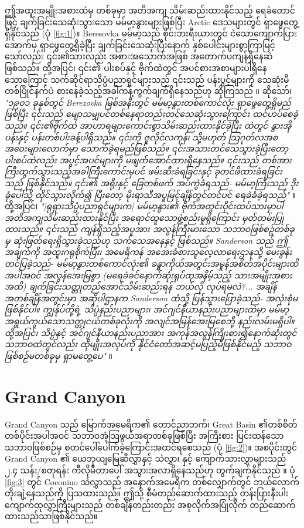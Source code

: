 \documentclass[10pt,twocolumn,letterpaper]{article}
\begin{document}
ဤအထူးအမျိုးအစားထဲမှ တစ်ခုမှာ အတိအကျ သိမ်းဆည်းထားနိုင်သည့် ရေခဲတောင်ဖြင့် ချက်ခြင်းသေဆုံးသွားသော မမ်မာ့နွားများဖြစ်ပြီး Arctic ဒေသများတွင် ရှာဖွေတွေ့ရှိနိုင်သည် (ပုံ \ref{fig:1})။ Beresovka မမ်မာ့သည် စိုင်းဘးရီးယားတွင် ငဲသောကျောက်ပြားအောက်မှ ရှာဖွေတွေ့ရှိခဲ့ပြီး ချက်ခြင်းသေဆုံးပြီးနောက် နှစ်ပေါင်းများစွာကြာမြင့်သော်လည်း ၎င်း၏သားလည်း အစားအသောက်အဖြစ် အတောက်ပကျန်ရှိနေဆဲဖြစ်သည်။ ထို့အပြင်၊ ၎င်း၏ ပါးစပ်နှင့် ဗိုက်ထဲတွင် အပင်စားအစာများပါရှိနေသောကြောင့် သက်ဆိုင်ရာသိပ္ပံပညာရှင်များသည် ၎င်းသည် ပန်းပွင့်များကို သေဆုံးမီ တစ်ပြိုင်နက်ပဲ စားနေခဲ့သည့်အခါကန့်ကွက်ချက်ရှိနေသည်ဟု ဆိုကြသည် \cite{17}။ ဆိုသော်၊ \textit{"၁၉၀၁ ခုနှစ်တွင် Berezovka မြစ်အနီးတွင် မမ်မာ့နွားတစ်ကောင်လုံး ရှာဖွေတွေ့ရှိမည်ဖြစ်ပြီး ၎င်းသည် မျောသမျှပင်တစ်နေရာတည်းတင်သေဆုံးသွားကြောင်း ထင်ဟပ်စေခဲ့သည်။ ၎င်း၏ဗိုက်ထဲ အာဟာရများကောင်းစွာသိမ်းဆည်းထားနိုင်ခဲ့ပြီး ထဲတွင် နွားအိုပန်းနှင့် ပန်းတစ်ပါးခန့်ပါရှိသည်။ ၎င်းကို ဇူလိုင်လကုန်၊ သို့မဟုတ် သြဂုတ်လအစအဝေးများလောက်မှာ သောက်ခဲ့ရမည်ဖြစ်သည်။ ၎င်းအသားတင်သေသွားခဲ့ပြီးတော့ပါးစပ်ထဲလည်း အပွင့်အပင်များကို မဖျက်အောင်ထားရှိနေသည်။ ၎င်းသည် တစ်အားကြီးထွက်သွားသည့်အခါကြီးကောင်းမှပင် ဖမ်းဆီးခံရခြင်းနှင့် ခုတင်ဖိထားခံရခြင်းသည် ဖြစ်နိုင်သည်။ ၎င်း၏ အရိုးနှင့် ခြေတစ်ဖက် အပ်ကွဲခံရသည်- မမ်မာ့ကြီးသည် ဒိုးခုံပေါ်သို့ ထိုင်သွားလိုက်၍ ပြီးတော့ မိုးရာသီအပူမြင့်ချိန်တွင်တင်ပင် ရေခဲခံခဲ့ရသည်"} \cite{18}။ ထို့အပြင်၊ \textit{"[ရုရှားသိပ္ပံပညာရှင်များက] မမ်မာ့နွား၏ ဗိုက်အတွင်းပိုင်းထပ်သားမှာပါ အတိအကျသိမ်းဆည်းထားနိုင်ပြီး အရောင်ထူသောဖွဲ့စည်းမှုရှိကြောင်း မှတ်တမ်းပြုထားသည်။ ၎င်းသည် ကျန်ရှိသည့်အပူအား အလွန်ကြီးမားသော သဘာဝဖြစ်စဥ်တစ်ခုမှ ဆုံးဖြတ်ရေးရှိသွားခဲ့သည်ဟု သက်သေအနေနှင့် ဖြစ်သည်။ Sanderson သည် ဤအချက်ကို အထူးဂရုစိုက်ပြီး၊ အမေရိကန် အအေးခံစားသူလေ့လာရေးဌာနသို့ မေးခွန်းတင်ပြခဲ့သည်- မမ်မာ့နွားတစ်ကောင်လုံး၏ ခန္ဓာကိုယ်အတွင်းအမှုန်အစိတ်အပိုင်းများထိအပါအဝင် အလွန်အေးမြစွာ (မရေခဲခင်နောက်ဆုံးရုပ်ထုအနိမ့်သည့် သားအမျိုးအစားအထိ) ချက်ခြင်းသတ္တုတည်အောင်သိမ်းဆည်းရန် ဘယ်လို လုပ်ရမလဲ?... အချိန်အတစ်ချိန်အတွင်းမှာ အဆိုပါဌာနက Sanderson ထံသို့ ပြန်သွားပြောခဲ့သည်- အလုံးစုံမဖြစ်နိုင်ပါ။ ကျွန်ုပ်တို့ရဲ့ သိပ္ပံနည်းပညာများ၊ အင်ဂျင်နီယာနည်းပညာများထဲမှာ မမ်မာ့အရွယ်ကွယ်သောသတ္တုငယ်တစ်ခုလုံးကို အလျင်အမြန်အေးမြစေဘို့ နည်းလမ်းမရှိပါ။ ထို့အပြင်၊ သိပ္ပံနှင့် အင်ဂျင်နီယာနည်းပညာအား အကုန်အလွန်ကြိုးစား၍နောက်ဆုံးတွင် သဘာဝထဲတွင်လည်း ထိုမျိုးအလုပ်ကို နိုင်ငံတော်အဆင့်မပြည့်မီဖြစ်နိုင်မည့် သဘာဝဖြစ်စဉ်မတစ်ခုမှ ရှာမတွေ့ပေ"} \cite{19}။

\section{Grand Canyon}

Grand Canyon သည် မြောက်အမေရိက၏ တောင်ညာဘက်၊ Great Basin ၏တစ်စိတ်တစ်ပိုင်းအပါအဝင် သဘာဝအံ့သြဖွယ်အရာတစ်ခုဖြစ်ပြီး အကြီးစား ပြင်းထန်သော သဘာဝဖြစ်စဉ်မှ စတင်ပေါ်ပေါက်ခဲ့ကြောင်းအထင်ရစေသည် (ပုံ \ref{fig:2})။ အစပိုင်းတွင် Grand Canyon ၏ ယေဘုယျမြေဆီလွှာနှင့် သဲလွှာ၊ နှင့် ကျောက်သားလွှာများသည် ၂.၄ သန်း/စတုရန်း ကီလိုမီတာပေါ် အသွားအလာရှိနေသည်ဟု တွက်ချက်နိုင်သည် \cite{21}။ ပုံ \ref{fig:3} တွင် Coconino သဲလွှာသည် အနောက်အမေရိက တစ်လျှောက်တွင် ဘယ်လောက်တိုးချဲ့နေသည်ကို ပြသထားသည်။ ဤသို့ စီမံတည်ဆောက်ထားသည့် တန်းပြားနီးပါးကျောက်ထုလွှာကြီးများသည် တစ်ချိန်တည်းတည်း အစုလိုက်အပြုံလိုက် တည်ဆောက်ထားသည်သာဖြစ်နိုင်သည်။
\end{document}
